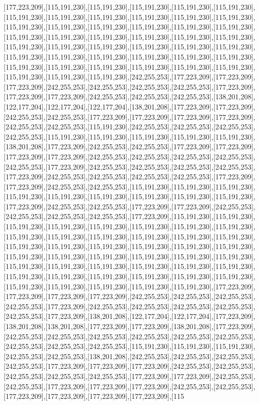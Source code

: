 [177,223,209],[115,191,230],[115,191,230],[115,191,230],[115,191,230],[115,191,230],[115,191,230],[115,191,230],[115,191,230],[115,191,230],[115,191,230],[115,191,230],[115,191,230],[115,191,230],[115,191,230],[115,191,230],[115,191,230],[115,191,230],[115,191,230],[115,191,230],[115,191,230],[115,191,230],[115,191,230],[115,191,230],[115,191,230],[115,191,230],[115,191,230],[115,191,230],[115,191,230],[115,191,230],[115,191,230],[115,191,230],[115,191,230],[115,191,230],[115,191,230],[115,191,230],[115,191,230],[115,191,230],[115,191,230],[115,191,230],[115,191,230],[115,191,230],[115,191,230],[115,191,230],[115,191,230],[242,255,253],[177,223,209],[177,223,209],[177,223,209],[242,255,253],[242,255,253],[242,255,253],[242,255,253],[177,223,209],[177,223,209],[177,223,209],[242,255,253],[242,255,253],[242,255,253],[138,201,208],[122,177,204],[122,177,204],[122,177,204],[138,201,208],[177,223,209],[177,223,209],[242,255,253],[242,255,253],[177,223,209],[177,223,209],[177,223,209],[177,223,209],[242,255,253],[242,255,253],[115,191,230],[242,255,253],[242,255,253],[242,255,253],[242,255,253],[115,191,230],[115,191,230],[115,191,230],[115,191,230],[115,191,230],[138,201,208],[177,223,209],[242,255,253],[242,255,253],[177,223,209],[177,223,209],[177,223,209],[177,223,209],[242,255,253],[242,255,253],[242,255,253],[242,255,253],[242,255,253],[177,223,209],[242,255,253],[242,255,253],[242,255,253],[242,255,253],[177,223,209],[242,255,253],[242,255,253],[242,255,253],[242,255,253],[177,223,209],[177,223,209],[242,255,253],[242,255,253],[115,191,230],[115,191,230],[115,191,230],[115,191,230],[115,191,230],[115,191,230],[115,191,230],[115,191,230],[115,191,230],[177,223,209],[242,255,253],[242,255,253],[177,223,209],[177,223,209],[242,255,253],[242,255,253],[242,255,253],[242,255,253],[177,223,209],[115,191,230],[115,191,230],[115,191,230],[115,191,230],[115,191,230],[115,191,230],[115,191,230],[115,191,230],[115,191,230],[115,191,230],[115,191,230],[115,191,230],[115,191,230],[115,191,230],[115,191,230],[115,191,230],[115,191,230],[115,191,230],[115,191,230],[115,191,230],[115,191,230],[115,191,230],[115,191,230],[115,191,230],[115,191,230],[115,191,230],[115,191,230],[115,191,230],[115,191,230],[115,191,230],[115,191,230],[115,191,230],[115,191,230],[115,191,230],[115,191,230],[115,191,230],[115,191,230],[115,191,230],[115,191,230],[115,191,230],[115,191,230],[115,191,230],[115,191,230],[177,223,209],[177,223,209],[177,223,209],[177,223,209],[242,255,253],[242,255,253],[242,255,253],[242,255,253],[177,223,209],[242,255,253],[242,255,253],[242,255,253],[242,255,253],[242,255,253],[177,223,209],[138,201,208],[122,177,204],[122,177,204],[177,223,209],[138,201,208],[138,201,208],[177,223,209],[177,223,209],[138,201,208],[177,223,209],[242,255,253],[242,255,253],[242,255,253],[242,255,253],[242,255,253],[242,255,253],[242,255,253],[242,255,253],[242,255,253],[115,191,230],[115,191,230],[115,191,230],[242,255,253],[242,255,253],[138,201,208],[242,255,253],[242,255,253],[242,255,253],[242,255,253],[177,223,209],[177,223,209],[177,223,209],[242,255,253],[242,255,253],[242,255,253],[242,255,253],[242,255,253],[177,223,209],[177,223,209],[242,255,253],[242,255,253],[177,223,209],[177,223,209],[177,223,209],[242,255,253],[242,255,253],[177,223,209],[177,223,209],[177,223,209],[177,223,209],[115
